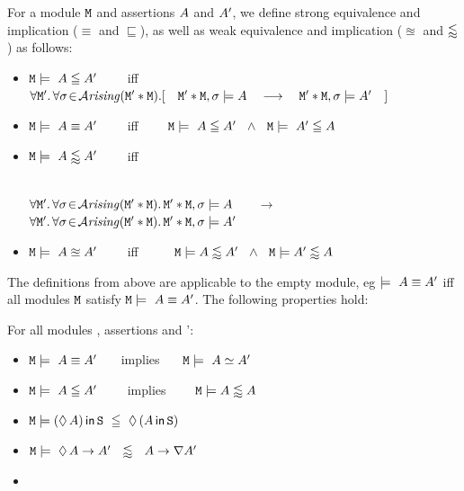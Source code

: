 \begin{definition}
\label{def:impl:equiv}
\noindent
For a module ${\mbox{\tt{M}}}$  and assertions $A$  and $A'$, we define strong equivalence and implication ($\equiv$ and $\sqsubseteq$), as well
as   weak equivalence and implication ($\approxeq$ and $\lessapprox$)  as follows:


 \begin{itemize}
\item
${\mbox{\tt{M}}}   \models\  A \leqq A'$  \ \ \ \ iff \ \ \ \
$\forall \M'.\, \forall \sigma\!\in\!\Arising(\M'*\M).[\ \ \  \M'*\M, \sigma \models \A \  \ \  \longrightarrow\  \ \  \M'*\M, \sigma \models \A'\ \ \ ]$
 \item
${\mbox{\tt{M}}}   \models\  A \equiv A'$ \ \ \ \ iff \ \ \ \
${\mbox{\tt{M}}}   \models\  A \leqq A'\ \  \wedge \ \  {\mbox{\tt{M}}}   \models\  A' \leqq A$
\item
${\mbox{\tt{M}}}   \models\   A \lessapprox A'$  \ \ \ \ iff \\ \ \ \ \ \ \
\strut  \hspace{1cm}  $\forall {\mbox{\tt{M}}}'.\, \forall \sigma\!\in\!{\mathcal{A}}\textrm{\textit{rising}}({\mbox{\tt{M}}}'*{\mbox{\tt{M}}}).\,{\mbox{\tt{M}}}'*{\mbox{\tt{M}}}, \sigma \models A$ \  \ \  $\longrightarrow$\  \ \
$\forall {\mbox{\tt{M}}}'.\, \forall \sigma\!\in\!{\mathcal{A}}\textrm{\textit{rising}}({\mbox{\tt{M}}}'*{\mbox{\tt{M}}}).\,{\mbox{\tt{M}}}'*{\mbox{\tt{M}}}, \sigma \models A'$
\item
${\mbox{\tt{M}}}   \models\  A \approxeq A'$   \ \ \ \ iff \ \ \ \ \
$ {\mbox{\tt{M}}}  \models  A \lessapprox A' \   \ \wedge\   \  {\mbox{\tt{M}}}  \models  A' \lessapprox A$
 \end{itemize}
\end{definition}

The definitions from above are applicable to the empty module, eg  $\models\  A \equiv A'$ iff   all modules ${\mbox{\tt{M}}}$ satisfy ${\mbox{\tt{M}}} \models\  A \equiv A'$.
The following properties hold:

\begin{lemma}
For all modules \M, assertions \A and \A':

 \begin{itemize}
 \item
${\mbox{\tt{M}}}   \models\  A \equiv A'$  \ \ \ implies \ \ \  ${\mbox{\tt{M}}}   \models\  A \simeq A'$
\item
${\mbox{\tt{M}}}   \models\  A \leqq A'$  \ \ \ \ implies  \ \ \ \
${\mbox{\tt{M}}} \models A \lessapprox A$
\item
$\M \models   \Using{(\Future{\A})}{\prg{S}}\ \strongImplies\ \Future{(\Using{\A} }{\prg{S}})$
\item
$ {\mbox{\tt{M}}} \models\  \lozenge\, A\rightarrow A' \  \  \lessapprox \ \ A\rightarrow\nabla A'$
\item

 \end{itemize}
\end{lemma}

